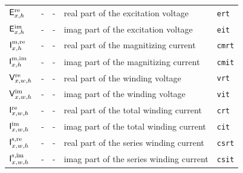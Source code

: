 \documentclass[journal]{IEEEtran}
\begin{document}
\begin{table}[H]
\begin{tabular}{l r r l l }
        $\mathsf{E}^{\text{re}}_{x,h}$              & -                                     & -                                         & real part of the excitation voltage       & \texttt{ert}      \\
        $\mathsf{E}^{\text{im}}_{x,h}$         & -                                     & -                                         & imag part of the excitation voltage       & \texttt{eit}      \\
        $\mathsf{I}^{\text{m,re}}_{x,h}$             & -                                     & -                                         & real part of the magnitizing current      & \texttt{cmrt}     \\
        $\mathsf{I}^{\text{m,im}}_{x,h}$        & -                                     & -                                         & imag part of the magnitizing current      & \texttt{cmit}     \\
        $\mathsf{V}^{\text{re}}_{x,w,h}$            & -                                     & -                                         & real part of the winding voltage          & \texttt{vrt}      \\
        $\mathsf{V}^{\text{im}}_{x,w,h}$       & -                                     & -                                         & imag part of the winding voltage          & \texttt{vit}      \\
        $\mathsf{I}^{\text{re}}_{x,w,h}$               & -                                     & -                                         & real part of the total winding current    & \texttt{crt}      \\ 
        $\mathsf{I}^{\text{im}}_{x,w,h}$          & -                                     & -                                         & imag part of the total winding current    & \texttt{cit}      \\ 
        $\mathsf{I}^{\text{s,re}}_{x,w,h}$         & -                                     & -                                         & real part of the series winding current   & \texttt{csrt}     \\ 
        $\mathsf{I}^{\text{s,im}}_{x,w,h}$    & -                                     & -                                         & imag part of the series winding current   & \texttt{csit}     \\
    \end{tabular}
\end{table}
\end{document}

